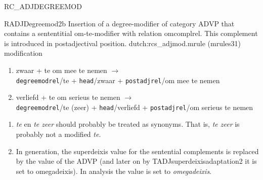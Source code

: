\begin{mruleclass}{RC\_ADJDEGREEMOD}
\begin{members}
\begin{member}
\end{member}
\begin{member}
 RADJDegreemod2b
 Insertion of a degree-modifier of category ADVP
that contains a sententitial om-te-modifier with relation omcomplrel.
This 
complement is introduced in postadjectival position.
\file dutch:rcs\_adjmod.mrule (mrules31)
\semantics modification
\example\mbox{}
 \begin{enumerate}
  \item 
zwaar + te om mee te nemen $\rightarrow$\\
{\tt degreemodrel}/te + {\tt head}/zwaar + {\tt postadjrel}/om mee te nemen
  \item
verliefd + te om serieus te nemen $\rightarrow$\\
{\tt degreemodrel}/te (zeer) + {\tt head}/verliefd + {\tt postadjrel}/om serieus te nemen 
\end{enumerate}
\remarks\mbox{}
\begin{enumerate}
\item {\em te} en {\em te zeer} should probably be treated
as synonyms. That is, {\em te zeer} is probably not
a modified {\em te}.

\item In generation, the superdeixis value 
for the sentential complements is replaced by the value of the
 ADVP (and later on 
by TADJsuperdeixisadaptation2 it is set to omegadeixis).
In analysis the value
is set to {\em omegadeixis}.
\end{enumerate}

\end{member}
\end{members}

\end{mruleclass}

